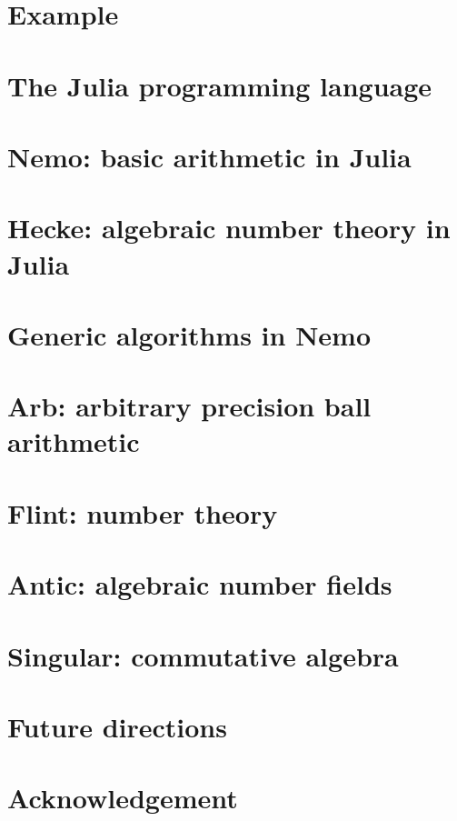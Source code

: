 \documentclass{sig-alternate-05-2015}
\begin{document}
\section{Example}

\section{The Julia programming language}

\section{Nemo: basic arithmetic in Julia}

\section{Hecke: algebraic number theory in Julia}

\section{Generic algorithms in Nemo}

\section{Arb: arbitrary precision ball arithmetic}

\section{Flint: number theory}

\section{Antic: algebraic number fields}

\section{Singular: commutative algebra}

\section{Future directions}

\section{Acknowledgement}
\end{document}
